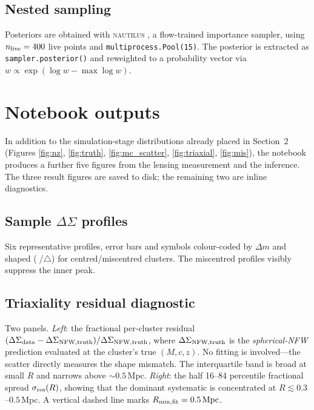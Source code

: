 \documentclass[11pt,a4paper]{article}
\newcommand{\dsig}{\Delta\Sigma}
\newcommand{\dm}{\Delta m}
\newcommand{\Rmin}{R_{\rm min,fit}}
\begin{document}
\subsection{Nested sampling}

Posteriors are obtained with \textsc{nautilus}
\citep{nautilus2023}, a flow-trained importance sampler, using
$n_{\rm live}=400$ live points and \texttt{multiprocess.Pool(15)}.  The
posterior is extracted as \texttt{sampler.posterior()} and reweighted to a
probability vector via $w \propto \exp(\log w - \max\log w)$.

\section{Notebook outputs}
\label{sec:plots}

In addition to the simulation-stage distributions already placed in
Section~2 (Figures \ref{fig:nz}, \ref{fig:truth}, \ref{fig:mc_scatter},
\ref{fig:triaxial}, \ref{fig:mis}), the notebook produces a further five
figures from the lensing measurement and the inference.  The three result
figures are saved to disk; the remaining two are inline diagnostics.

\subsection{Sample $\dsig$ profiles}
Six representative profiles, error bars and symbols colour-coded by $\dm$ and
shaped (\textcircled{}/\Large$\triangle$\normalsize) for centred/miscentred clusters.
The miscentred profiles visibly suppress the inner peak.

\subsection{Triaxiality residual diagnostic}
Two panels.  \emph{Left}: the fractional per-cluster residual
$(\dsig_{\rm data} - \dsig_{\rm NFW,truth})/\dsig_{\rm NFW,truth}$, where
$\dsig_{\rm NFW,truth}$ is the \emph{spherical-NFW} prediction evaluated at the
cluster's true $(M, c, z)$.  No fitting is involved—the scatter directly
measures the shape mismatch.  The interquartile band is broad at small $R$
and narrows above $\sim\!0.5$\,Mpc.  \emph{Right}: the half 16--84 percentile
fractional spread $\sigma_{\rm res}(R)$, showing that the dominant systematic
is concentrated at $R\lesssim 0.3$--$0.5$\,Mpc.  A vertical dashed line marks
$\Rmin = 0.5\,\mathrm{Mpc}$.
\end{document}
